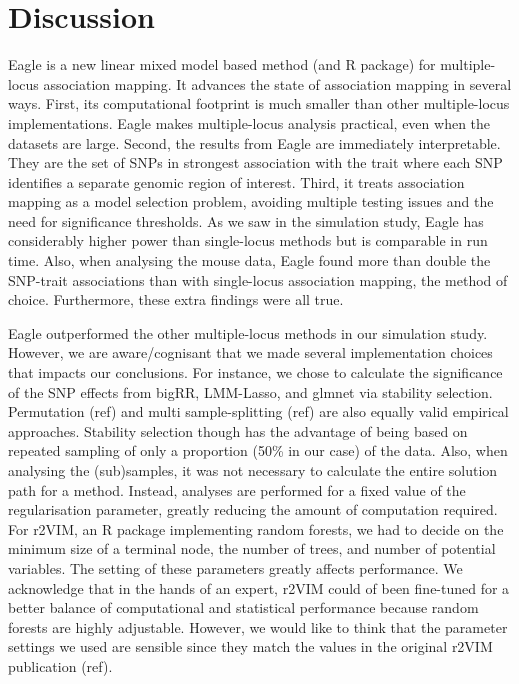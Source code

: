 \documentclass{article}
\begin{document}
  
  
\section{Discussion}
Eagle is a new linear mixed model based method (and R package) for multiple-locus association mapping. It advances the state of association mapping in several ways. 
First, its computational footprint is much smaller than other multiple-locus implementations. Eagle makes multiple-locus analysis 
practical, even when the datasets are large. Second, the results from
 Eagle are immediately interpretable. They are the set of SNPs in strongest association with the trait where 
each SNP identifies a separate genomic region of interest. Third, it treats association mapping as a model selection problem, avoiding 
multiple testing issues and the need for significance thresholds. 
 As we saw in the simulation study, Eagle has considerably higher power than single-locus methods but is comparable in run time.
Also, when analysing the mouse data, Eagle found more than double the SNP-trait associations than 
with single-locus association mapping, the method of choice. Furthermore, these extra findings were all true. 

Eagle outperformed the other multiple-locus methods in our simulation study. However, we are aware/cognisant that we made several implementation 
choices that impacts our conclusions.  For instance, we chose to calculate the significance of the 
SNP effects from bigRR, LMM-Lasso, and glmnet via stability selection.  Permutation (ref) and multi sample-splitting (ref) are also equally valid empirical approaches. Stability selection though has the advantage of being based on repeated sampling of only a proportion (50\% in our case) of the 
data. Also, when analysing the (sub)samples, it was not necessary to calculate the entire solution path for a method. 
 Instead,  analyses are 
performed for a fixed value of the regularisation parameter, greatly reducing the amount of computation required. For r2VIM, an R package 
implementing random forests, we had to decide on the  minimum size of a terminal node, the number of trees, and number of potential variables. 
The setting of these parameters greatly affects performance.  We  acknowledge that in the hands of an expert, 
r2VIM could of been fine-tuned for a better balance of computational and statistical performance because random forests are highly adjustable. 
However, we would like to think that the parameter settings we used are sensible since they match the values in the original r2VIM publication (ref). 
\end{document}
